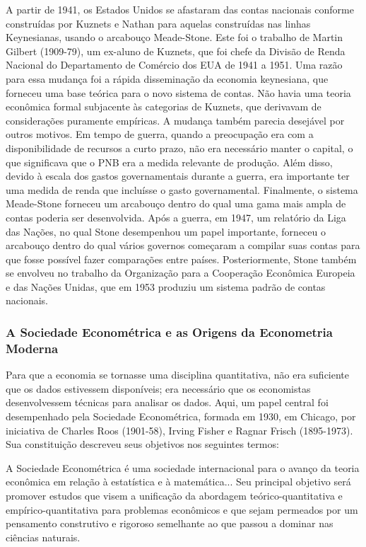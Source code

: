 \documentclass[12pt]{article}
\begin{document}
A partir de 1941, os Estados Unidos se afastaram das contas nacionais conforme construídas por Kuznets e Nathan para aquelas construídas nas linhas Keynesianas, usando o arcabouço Meade-Stone. Este foi o trabalho de Martin Gilbert (1909-79), um ex-aluno de Kuznets, que foi chefe da Divisão de Renda Nacional do Departamento de Comércio dos EUA de 1941 a 1951. Uma razão para essa mudança foi a rápida disseminação da economia keynesiana, que forneceu uma base teórica para o novo sistema de contas. Não havia uma teoria econômica formal subjacente às categorias de Kuznets, que derivavam de considerações puramente empíricas. A mudança também parecia desejável por outros motivos. Em tempo de guerra, quando a preocupação era com a disponibilidade de recursos a curto prazo, não era necessário manter o capital, o que significava que o PNB era a medida relevante de produção. Além disso, devido à escala dos gastos governamentais durante a guerra, era importante ter uma medida de renda que incluísse o gasto governamental. Finalmente, o sistema Meade-Stone forneceu um arcabouço dentro do qual uma gama mais ampla de contas poderia ser desenvolvida. Após a guerra, em 1947, um relatório da Liga das Nações, no qual Stone desempenhou um papel importante, forneceu o arcabouço dentro do qual vários governos começaram a compilar suas contas para que fosse possível fazer comparações entre países. Posteriormente, Stone também se envolveu no trabalho da Organização para a Cooperação Econômica Europeia e das Nações Unidas, que em 1953 produziu um sistema padrão de contas nacionais.

\subsubsection{\textbf{A Sociedade Econométrica e as Origens da Econometria Moderna}}

Para que a economia se tornasse uma disciplina quantitativa, não era suficiente que os dados estivessem disponíveis; era necessário que os economistas desenvolvessem técnicas para analisar os dados. Aqui, um papel central foi desempenhado pela Sociedade Econométrica, formada em 1930, em Chicago, por iniciativa de Charles Roos (1901-58), Irving Fisher e Ragnar Frisch (1895-1973). Sua constituição descreveu seus objetivos nos seguintes termos:

A Sociedade Econométrica é uma sociedade internacional para o avanço da teoria econômica em relação à estatística e à matemática... Seu principal objetivo será promover estudos que visem a unificação da abordagem teórico-quantitativa e empírico-quantitativa para problemas econômicos e que sejam permeados por um pensamento construtivo e rigoroso semelhante ao que passou a dominar nas ciências naturais.
\end{document}
